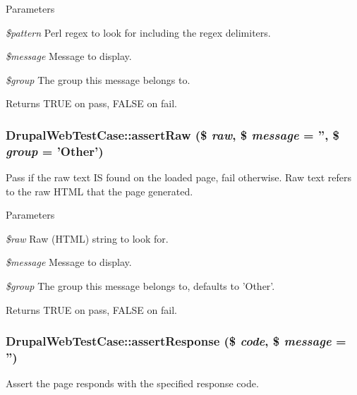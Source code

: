 \begin{DoxyParams}{Parameters}
\item[{\em \$pattern}]Perl regex to look for including the regex delimiters. \item[{\em \$message}]Message to display. \item[{\em \$group}]The group this message belongs to. \end{DoxyParams}
\begin{DoxyReturn}{Returns}
TRUE on pass, FALSE on fail. 
\end{DoxyReturn}
\hypertarget{class_drupal_web_test_case_ae15c8d3302ff90dc47d2fd7686ee4005}{
\subsubsection[{assertRaw}]{\setlength{\rightskip}{0pt plus 5cm}DrupalWebTestCase::assertRaw (\$ {\em raw}, \/  \$ {\em message} = {\ttfamily ''}, \/  \$ {\em group} = {\ttfamily 'Other'})}}
\label{class_drupal_web_test_case_ae15c8d3302ff90dc47d2fd7686ee4005}
Pass if the raw text IS found on the loaded page, fail otherwise. Raw text refers to the raw HTML that the page generated.


\begin{DoxyParams}{Parameters}
\item[{\em \$raw}]Raw (HTML) string to look for. \item[{\em \$message}]Message to display. \item[{\em \$group}]The group this message belongs to, defaults to 'Other'. \end{DoxyParams}
\begin{DoxyReturn}{Returns}
TRUE on pass, FALSE on fail. 
\end{DoxyReturn}
\hypertarget{class_drupal_web_test_case_af414857cce5491ca01a2f7ea9d2d60bf}{
\subsubsection[{assertResponse}]{\setlength{\rightskip}{0pt plus 5cm}DrupalWebTestCase::assertResponse (\$ {\em code}, \/  \$ {\em message} = {\ttfamily ''})}}
\label{class_drupal_web_test_case_af414857cce5491ca01a2f7ea9d2d60bf}
Assert the page responds with the specified response code.


